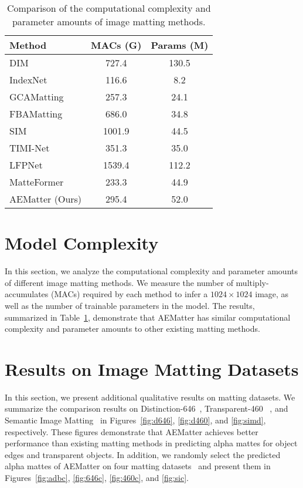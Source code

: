 \documentclass[10pt,twocolumn,letterpaper]{article}
\begin{document}
\begin{table}[!t]
  \centering
  \caption{Comparison of the computational complexity and parameter amounts of image matting methods. }
    \begin{tabular}{l|c|c}
    \toprule
    Method & MACs (G) & Params (M) \\
    \midrule
    DIM~\cite{xu2017deep}   & 727.4 & 130.5  \\
    IndexNet~\cite{lu2019indices} & 116.6 & 8.2  \\
    GCAMatting~\cite{li2020natural} & 257.3 & 24.1  \\
    FBAMatting~\cite{forte2020fbamatting} & 686.0   & 34.8  \\
    SIM~\cite{sun2021sim}   & 1001.9 & 44.5  \\
    TIMI-Net~\cite{Liu_2021_ICCV}  & 351.3 & 35.0  \\
    LFPNet~\cite{liu2021lfpnet} & 1539.4 & 112.2  \\
    MatteFormer~\cite{park2022matteformer} & 233.3 & 44.9  \\
    \midrule
    AEMatter (Ours) & 295.4 & 52.0  \\
    \bottomrule
    \end{tabular}\label{tab:cs}\end{table}\section{Model Complexity}
\label{sec:cc1}
In this section, we analyze the computational complexity and parameter amounts of different image matting methods.
We measure the number of multiply-accumulates (MACs) required by each method to infer a $1024 \times 1024$ image, as well as the number of trainable parameters in the model.
The results, summarized in Table~\ref{tab:cs}, demonstrate that AEMatter has similar computational complexity and parameter amounts to other existing matting methods.



\section{Results on Image Matting Datasets}
\label{sec:cc4}
In this section, we present additional qualitative results on matting datasets. 
We summarize the comparison results on Distinction-646~\cite{qiao2020attention}, Transparent-460~
\cite{cai2022TransMatting}, and Semantic Image Matting~\cite{sun2021sim} in Figures~\ref{fig:d646}, \ref{fig:d460}, and \ref{fig:simd}, respectively.
These figures demonstrate that AEMatter achieves better performance than existing matting methods in predicting alpha mattes for object edges and transparent objects.
In addition, we randomly select the predicted alpha mattes of AEMatter on four matting datasets~\cite{xu2017deep,qiao2020attention,cai2022TransMatting,sun2021sim} and present them in Figures~\ref{fig:adbc}, \ref{fig:646c}, \ref{fig:460c}, and \ref{fig:sic}.
\end{document}
